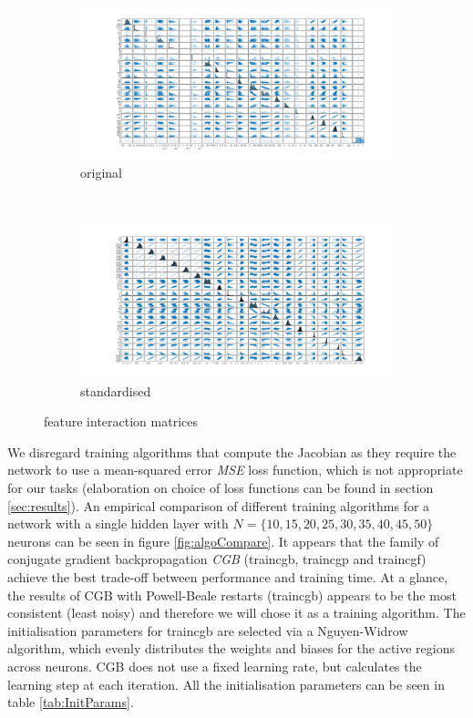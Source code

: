 \documentclass[11pt,a4paper]{article}
\begin{document}
\begin{figure}[htb]
  \centering
  \begin{subfigure}[b]{0.45\textwidth}
    \centering
    \includegraphics[width=\textwidth]{figures/plotmatrix_X.png}
    \caption{original}
    \label{fig:plotmatrixX}
  \end{subfigure}
  ~
  \centering
  \begin{subfigure}[b]{0.45\textwidth}
    \centering
    \includegraphics[width=\textwidth]{figures/plotmatrix_standardised_X.png}
    \caption{standardised}
    \label{fig:plotmatrixStandardisedX}
  \end{subfigure}
  \caption{feature interaction matrices}
\end{figure}

We disregard training algorithms that compute the Jacobian as they require the network to use a mean-squared error \textit{MSE} loss function, which is not appropriate for our tasks (elaboration on choice of loss functions can be found in section \ref{sec:results}). An empirical comparison of different training algorithms for a network with a single hidden layer with \(N = \{10,15,20,25,30,35,40,45,50\}\) neurons can be seen in figure \ref{fig:algoCompare}. It appears that the family of conjugate gradient backpropagation \textit{CGB} (traincgb, traincgp and traincgf) achieve the best trade-off between performance and training time. At a glance, the results of CGB with Powell-Beale restarts (traincgb) appears to be the most consistent (least noisy) and therefore we will chose it as a training algorithm. The initialisation parameters for traincgb are selected via a Nguyen-Widrow \autocite{NetParamInit} algorithm, which evenly distributes the weights and biases for the active regions across neurons. CGB does not use a fixed learning rate, but calculates the learning step at each iteration. All the initialisation parameters can be seen in table \ref{tab:InitParams}.
\end{document}
